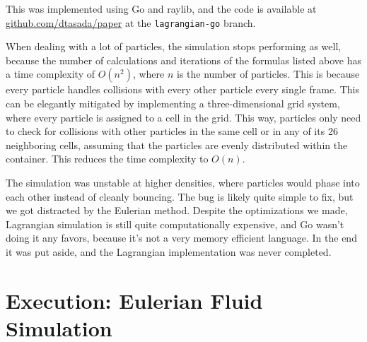 \documentclass[a4paper,12pt,titlepage]{article}
\begin{document}
This was implemented using Go and raylib, and the code is available at
\href{www.github.com/dtasada/paper}{github.com/dtasada/paper} at the \lstinline[breaklines]{lagrangian-go} branch.

When dealing with a lot of particles, the simulation stops performing as well,
because the number of calculations and iterations of the formulas listed above
has a time complexity of $O(n^2)$, where $n$ is the number of particles. This is
because every particle handles collisions with every other particle every
single frame. This can be elegantly mitigated by implementing a three-dimensional
grid system, where every particle is assigned to a cell in the grid. This way,
particles only need to check for collisions with other particles in the same cell
or in any of its 26 neighboring cells, assuming that the particles are evenly
distributed within the container. This reduces the time complexity to $O(n)$.

The simulation was unstable at higher densities, where particles would phase
into each other instead of cleanly bouncing. The bug is likely quite simple to
fix, but we got distracted by the Eulerian method. Despite the optimizations we
made, Lagrangian simulation is still quite computationally expensive, and Go
wasn't doing it any favors, because it's not a very memory efficient language.
In the end it was put aside, and the Lagrangian implementation was never completed.

\pagebreak
\section{Execution: Eulerian Fluid Simulation}
\end{document}
